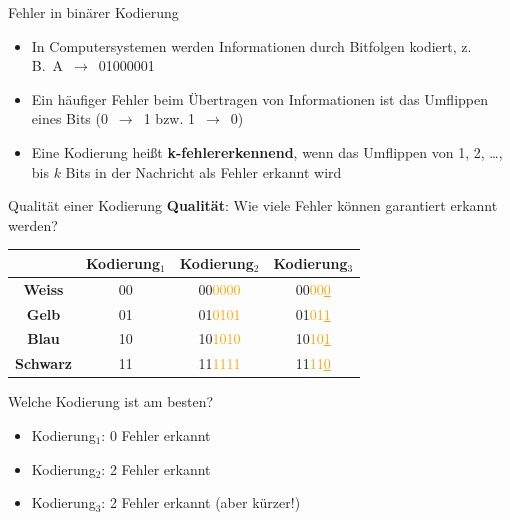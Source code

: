 \begin{frame}{Fehler in binärer Kodierung}
    \begin{itemize}
        \item In Computersystemen werden Informationen durch Bitfolgen kodiert, z.\,B.\ A~$\rightarrow$~01000001
        \item Ein häufiger Fehler beim Übertragen von Informationen ist das Umflippen eines Bits (0~$\rightarrow$~1 bzw. 1~$\rightarrow$~0)
        \item Eine Kodierung heißt \textbf{k-fehlererkennend}, wenn das Umflippen von 1, 2, \dots, bis $k$ Bits in der Nachricht als Fehler erkannt wird
    \end{itemize}
\end{frame}

\begin{frame}{Qualität einer Kodierung}
    \textbf{Qualität}: Wie viele Fehler können garantiert erkannt werden?
    \begin{table}[H]
        \centering
        \begin{tabular}{c|c|c|c}
                             & \textbf{Kodierung$_1$} & \textbf{Kodierung$_2$}     & \textbf{Kodierung$_3$}                \\
            \midrule\midrule
            \textbf{Weiss}   & 00                     & 00\textcolor{orange}{0000} & 00\textcolor{orange}{00\underline{0}} \\
            \midrule
            \textbf{Gelb}    & 01                     & 01\textcolor{orange}{0101} & 01\textcolor{orange}{01\underline{1}} \\
            \midrule
            \textbf{Blau}    & 10                     & 10\textcolor{orange}{1010} & 10\textcolor{orange}{10\underline{1}} \\
            \midrule
            \textbf{Schwarz} & 11                     & 11\textcolor{orange}{1111} & 11\textcolor{orange}{11\underline{0}} \\
        \end{tabular}
        \label{tab:codes}
    \end{table}
    Welche Kodierung ist am besten?
    \begin{itemize}
        \item Kodierung$_1$: 0 Fehler erkannt
        \item Kodierung$_2$: 2 Fehler erkannt
        \item Kodierung$_3$: 2 Fehler erkannt (aber kürzer!)
    \end{itemize}
\end{frame}

